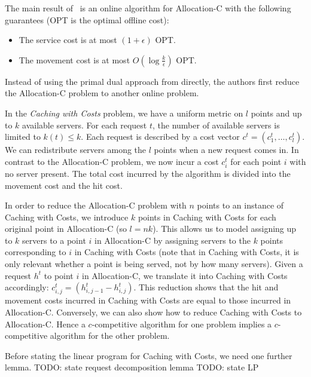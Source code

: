 The main result of~\cite{bansal10:k-server} is an online algorithm for Allocation-C with the following guarantees (OPT is the optimal offline cost):
\begin{itemize}
\item The service cost is at most $(1+\epsilon)$ OPT.
\item The movement cost is at most $O(\log\frac{k}{\epsilon})$ OPT.
\end{itemize}

Instead of using the primal dual approach from \cite{buchbinder09:survey} directly, the authors first reduce the Allocation-C problem to another online problem.

In the \emph{Caching with Costs} problem, we have a uniform metric on $l$ points and up to $k$ available servers.
For each request $t$, the number of available servers is limited to $k(t) \leq k$.
Each request is described by a cost vector $c^t = (c_1^t, \ldots, c^t_l)$.
We can redistribute servers among the $l$ points when a new request comes in.
In contrast to the Allocation-C problem, we now incur a cost $c_i^t$ for each point $i$ with no server present.
The total cost incurred by the algorithm is divided into the movement cost and the hit cost.

In order to reduce the Allocation-C problem with $n$ points to an instance of Caching with Costs, we introduce $k$ points in Caching with Costs for each original point in Allocation-C (so $l = nk$).
This allows us to model assigning up to $k$ servers to a point $i$ in Allocation-C by assigning servers to the $k$ points corresponding to $i$ in Caching with Costs (note that in Caching with Costs, it is only relevant whether a point is being served, not by how many servers).
Given a request $h^t$ to point $i$ in Allocation-C, we translate it into Caching with Costs accordingly: $c^t_{i,j} = (h^t_{i,j-1} - h_{i,j}^t)$.
This reduction shows that the hit and movement costs incurred in Caching with Costs are equal to those incurred in Allocation-C.
Conversely, we can also show how to reduce Caching with Costs to Allocation-C.
Hence a $c$-competitive algorithm for one problem implies a $c$-competitive algorithm for the other problem.

Before stating the linear program for Caching with Costs, we need one further lemma.
TODO: state request decomposition lemma
TODO: state LP

